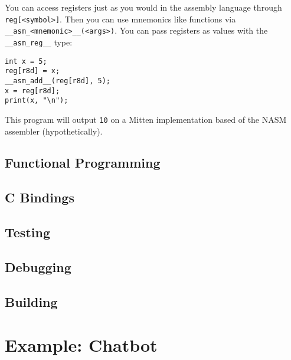 \documentclass[10pt,a4paper]{article}
\begin{document}
You can access registers just as you would in the assembly language through \verb|reg[<symbol>]|. Then you can use mnemonics like functions via \verb|__asm_<mnemonic>__(<args>)|. You can pass registers as values with the \verb|__asm_reg__| type:
\begin{verbatim}
int x = 5;
reg[r8d] = x;
__asm_add__(reg[r8d], 5);
x = reg[r8d];
print(x, "\n");
\end{verbatim}

This program will output \verb|10| on a Mitten implementation based of the NASM assembler (hypothetically). 

\newpage





\subsection{Functional Programming}
\newpage




\subsection{C Bindings}


\newpage





\subsection{Testing}
\newpage





\subsection{Debugging}
\newpage





\subsection{Building}
\newpage





\section{Example: Chatbot}
\newpage
\end{document}
